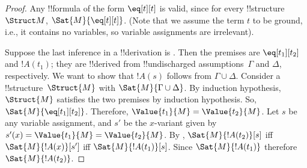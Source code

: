 \documentclass[../../include/open-logic-section]{subfiles}
\begin{document}
\begin{proof}
Any !!{formula} of the form $\eq[t][t]$ is valid, since
for every !!{structure}~$\Struct M$, $\Sat{M}{\eq[t][t]}$. (Note that
we assume the term $t$ to be ground, i.e., it contains no variables,
so variable assignments are irrelevant).

Suppose the last inference in a !!{derivation} is \Elim{\eq}. Then the
premises are $\eq[t_1][t_2]$ and $!A(t_1)$; they are !!{derive}d from
!!{undischarged} assumptions~$\Gamma$ and $\Delta$, respectively.  We
want to show that $!A(s)$ follows from $\Gamma \cup \Delta$.  Consider
a !!{structure}~$\Struct{M}$ with $\Sat{M}{\Gamma \cup \Delta}$. By induction
hypothesis, $\Struct{M}$ satisfies the two premises by induction
hypothesis. So, $\Sat{M}{\eq[t_1][t_2]}$. Therefore, $\Value{t_1}{M} =
\Value{t_2}{M}$. Let $s$ be any variable assignment, and $s'$ be the
$x$-variant given by $s'(x) = \Value{t_1}{M} = \Value {t_2}{M}$. By
, $\Sat{M}{!A(t_2)}[s]$ iff
$\Sat{M}{!A(x)}[s']$ iff $\Sat{M}{!A(t_1)}[s]$. Since $\Sat{M}
      {!A(t_1)}$ therefore $\Sat{M}{!A(t_2)}$.
\end{proof}
\end{document}
